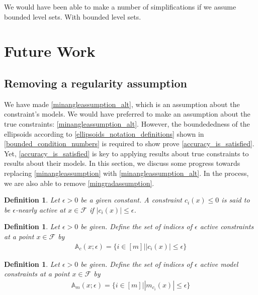 \documentclass{article}
\newtheorem{definition}[theorem]{Definition}
\theoremstyle{case}
\numberwithin{theorem}{subsection}
\newcommand{\feasible}{{\mathcal F}}
\newcommand{\epsactive}{{\mathbb A_c}}
\newcommand{\epsactivemodels}{{\mathbb A_{m}}}
\begin{document}
We would have been able to make a number of simplifications if we assume bounded level sets.
With bounded level sets.


\section{Future Work}
\subsection{Removing a regularity assumption}
\label{alternative_assumptions_section}

We have made \cref{minangleassumption_alt}, which is an assumption about the constraint's models.
We would have preferred to make an assumption about the true constraints: \cref{minangleassumption_alt}.
However, the boundededness of the ellipsoids according to \cref{ellipsoids_notation_definitions} shown in \cref{bounded_condition_numbers}
is required to show prove \cref{accuracy_is_satisfied}.
Yet, \cref{accuracy_is_satisfied} is key to applying results about true constraints to results about their models.
In this section, we discuss some progress towards replacing \cref{minangleassumption} with \cref{minangleassumption_alt}.
In the process, we are also able to remove \cref{mingradassumption}.






\begin{definition}
Let $\epsilon > 0$ be a given constant.
A constraint $c_i(x) \le 0$ is said to be $\epsilon$-nearly active at $x \in \feasible$ if $|c_i(x)| \le \epsilon$.
\end{definition}

\begin{definition}
Let $\epsilon > 0$ be given.
Define the set of indices of $\epsilon$ active constraints at a point $x \in \feasible$ by
\begin{align}
\epsactive(x; \epsilon) = \bigg\{ i \in [m] \bigg | |c_i(x)| \le \epsilon \bigg\} \label{define_epsactive}
\end{align}
\end{definition}

\begin{definition}
Let $\epsilon > 0$ be given.
Define the set of indices of $\epsilon$ active model constraints at a point $x \in \feasible$ by
\begin{align}
\epsactivemodels(x; \epsilon) = \bigg\{ i \in [m] \bigg | |m_{c_i}(x)| \le \epsilon  \bigg\} \label{define_epsactivemodels}
\end{align}
\end{definition}
\end{document}

